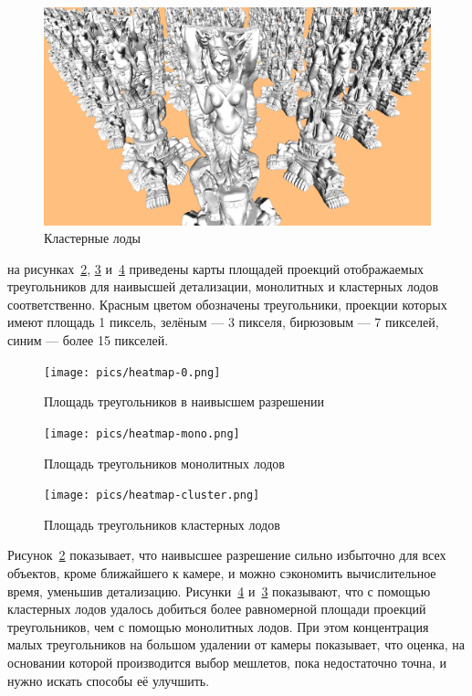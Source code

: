 \begin{figure}[H]
    \includegraphics[width=\textwidth]{pics/comparison-cluster.png}
    \caption{Кластерные лоды}
    \label{fig:comparison-cluster}
\end{figure}

на рисунках~\ref{fig:heatmap-0}, \ref{fig:heatmap-mono} и~\ref{fig:heatmap-cluster} приведены карты площадей проекций отображаемых треугольников для наивысшей детализации, монолитных и кластерных лодов соответственно.
Красным цветом обозначены треугольники, проекции которых имеют площадь 1 пиксель, зелёным --- 3 пикселя, бирюзовым --- 7 пикселей, синим --- более 15 пикселей.

\begin{figure}[H]
    \texttt{[image: pics/heatmap-0.png]}
    \caption{Площадь треугольников в наивысшем разрешении}
    \label{fig:heatmap-0}
\end{figure}

\begin{figure}[H]
    \texttt{[image: pics/heatmap-mono.png]}
    \caption{Площадь треугольников монолитных лодов}
    \label{fig:heatmap-mono}
\end{figure}

\begin{figure}[H]
    \texttt{[image: pics/heatmap-cluster.png]}
    \caption{Площадь треугольников кластерных лодов}
    \label{fig:heatmap-cluster}
\end{figure}

Рисунок~\ref{fig:heatmap-0} показывает, что наивысшее разрешение сильно избыточно для всех объектов, кроме ближайшего к камере, и можно сэкономить вычислительное время, уменьшив детализацию.
Рисунки~\ref{fig:heatmap-cluster} и~\ref{fig:heatmap-mono} показывают, что с помощью кластерных лодов удалось добиться более равномерной площади проекций треугольников, чем с помощью монолитных лодов.
При этом концентрация малых треугольников на большом удалении от камеры показывает, что оценка, на основании которой производится выбор мешлетов, пока недостаточно точна, и нужно искать способы её улучшить.

